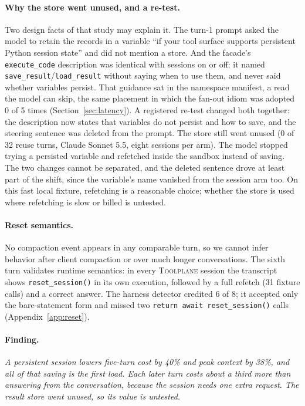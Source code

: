 \documentclass[10pt,twocolumn]{article}
\newcommand{\toolplane}{\textsc{Toolplane}\xspace}
\newcommand{\finding}[1]{\paragraph{Finding.} \emph{#1}}
\begin{document}
\paragraph{Why the store went unused, and a re-test.}  Two design facts of
that study may explain it.  The turn-1 prompt asked the model to retain the
records in a variable ``if your tool surface supports persistent Python
session state'' and did not mention a store.  And the facade's
\texttt{execute\_code} description was identical with sessions on or off: it
named \texttt{save\_result}/\texttt{load\_result} without saying when to use
them, and never said whether variables persist.  That guidance sat in the
namespace manifest, a read the model can skip, the same placement in which
the fan-out idiom was adopted 0 of 5 times (Section~\ref{sec:latency}).  A
registered re-test changed both together: the description now states that
variables do not persist and how to save, and the steering sentence was
deleted from the prompt.  The store still went unused (0 of 32 reuse turns,
Claude Sonnet 5.5, eight sessions per arm).  The model stopped trying a
persisted variable and refetched inside the sandbox instead of saving.  The
two changes cannot be separated, and the deleted sentence drove at least part
of the shift, since the variable's name vanished from the session arm too.
On this fast local fixture, refetching is a reasonable choice; whether the
store is used where refetching is slow or billed is untested.

\paragraph{Reset semantics.}  No compaction event appears in any comparable
turn, so we cannot infer behavior after client compaction or over much longer
conversations.  The sixth turn validates runtime semantics: in every
\toolplane session the transcript shows \texttt{reset\_session()} in its own
execution, followed by a full refetch (31 fixture calls) and a correct answer.
The harness detector credited 6 of 8; it accepted only the bare-statement form
and missed two \texttt{return await reset\_session()} calls
(Appendix~\ref{app:reset}).

\finding{A persistent session lowers five-turn cost by 40\% and peak context by 38\%,
and all of that saving is the first load.  Each later turn costs about a third
more than answering from the conversation, because the session needs one
extra request.  The result store went unused, so its value is untested.}
\end{document}
